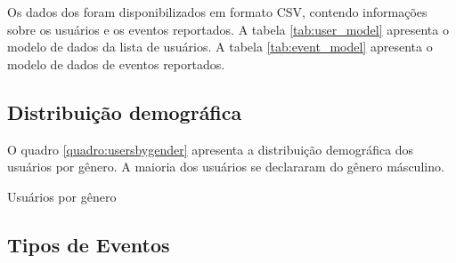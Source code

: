 Os dados dos foram disponibilizados em formato CSV, contendo informações sobre os usuários e os eventos reportados. A tabela \autoref{tab:user_model} apresenta o modelo de dados da lista de usuários. A tabela \autoref{tab:event_model} apresenta o modelo de dados de eventos reportados.

\subsection{Distribuição demográfica}

O quadro \autoref{quadro:usersbygender} apresenta a distribuição demográfica dos usuários por gênero. A maioria dos usuários se declararam do gênero másculino. 


\begin{quadro}[htb]
    \caption{Usuários por gênero}
    \label{quadro:usersbygender}
    \centering
\end{quadro}

\subsection{Tipos de Eventos}

